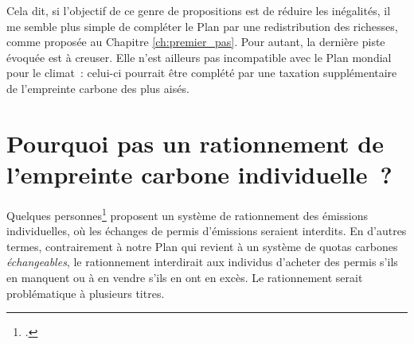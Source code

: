 \documentclass[a5paper,french,openany]{memoir}
\begin{document}

Cela dit, si l'objectif de ce genre de propositions est de réduire les inégalités, il me semble plus simple de compléter le Plan par une redistribution des richesses, comme proposée au Chapitre \ref{ch:premier_pas}. Pour autant, la dernière piste évoquée est à creuser. Elle n'est ailleurs pas incompatible avec le Plan mondial pour le climat~: celui-ci pourrait être complété par une taxation supplémentaire de l'empreinte carbone des plus aisés. 

\section*{\normalsize Pourquoi pas un rationnement de l'empreinte carbone individuelle~?}\label{q:rationnement}

Quelques %
personnes\footnote{\cite{wood_rationing_2023}.} proposent un système de rationnement des émissions individuelles, où les échanges de permis d'émissions seraient interdits. En d'autres termes, contrairement à notre Plan qui revient à un système de quotas carbones \textit{échangeables}, le rationnement interdirait aux individus d'acheter des permis s'ils en manquent ou à en vendre s'ils en ont en excès. %
Le rationnement serait problématique à plusieurs titres. 
\end{document}
